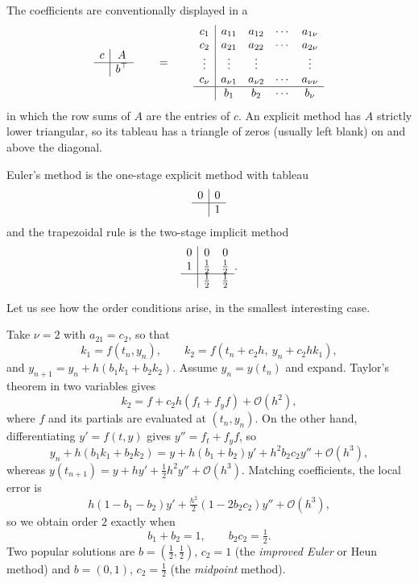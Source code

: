 \documentclass[a4paper]{scrartcl}
\begin{document}
The coefficients are conventionally displayed in a 
$$
\begin{array}{c|c}
  c & A\\ \hline
    & b^\top
\end{array}
\qquad = \qquad
\begin{array}{c|cccc}
  c_1 & a_{11} & a_{12} & \cdots & a_{1\nu}\\
  c_2 & a_{21} & a_{22} & \cdots & a_{2\nu}\\
  \vdots & \vdots & \vdots & & \vdots\\
  c_\nu & a_{\nu 1} & a_{\nu 2} & \cdots & a_{\nu\nu}\\
  \hline
      & b_1 & b_2 & \cdots & b_\nu
\end{array}
$$
in which the row sums of $A$ are the entries of $c$. An explicit method has $A$ strictly lower triangular, so its tableau has a triangle of zeros (usually left blank) on and above the diagonal.

\begin{example}
  Euler's method is the one-stage explicit method with tableau
  $$
  \begin{array}{c|c}
    0 & 0\\\hline & 1
  \end{array}
  $$
  and the trapezoidal rule is the two-stage implicit method
  $$
  \begin{array}{c|cc}
    0 & 0 & 0\\
    1 & \tfrac12 & \tfrac12\\\hline
      & \tfrac12 & \tfrac12
  \end{array}.
  $$
\end{example}

Let us see how the order conditions arise, in the smallest interesting case.

\begin{example}\label{eg:rk2}
  Take $\nu = 2$ with $a_{21} = c_2$, so that
  $$
  k_1 = f(t_n,y_n), \qquad k_2 = f(t_n + c_2h,\ y_n + c_2hk_1),
  $$
  and $y_{n+1} = y_n + h(b_1k_1 + b_2k_2)$. Assume $y_n = y(t_n)$ and expand. Taylor's theorem in two variables gives
  $$
  k_2 = f + c_2h\left(f_t + f_y f\right) + \mathcal{O}(h^2),
  $$
  where $f$ and its partials are evaluated at $(t_n,y_n)$. On the other hand, differentiating $y' = f(t,y)$ gives $y'' = f_t + f_y f$, so
  $$
  y_n + h(b_1k_1 + b_2k_2) = y + h(b_1 + b_2)y' + h^2 b_2c_2 y'' + \mathcal{O}(h^3),
  $$
  whereas $y(t_{n+1}) = y + hy' + \tfrac12 h^2 y'' + \mathcal{O}(h^3)$. Matching coefficients, the local error is
  $$
  h(1 - b_1 - b_2)y' + \tfrac{h^2}{2}(1 - 2b_2c_2)y'' + \mathcal{O}(h^3),
  $$
  so we obtain order $2$ exactly when
  $$
  b_1 + b_2 = 1, \qquad b_2c_2 = \tfrac12 .
  $$
  Two popular solutions are $b = (\tfrac12,\tfrac12)$, $c_2 = 1$ (the \emph{improved Euler} or Heun method) and $b = (0,1)$, $c_2 = \tfrac12$ (the \emph{midpoint} method).
\end{example}
\end{document}
